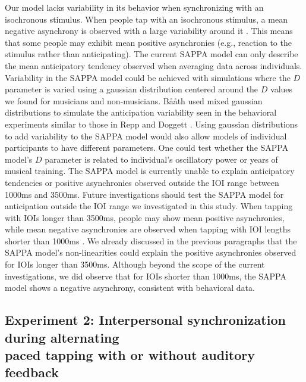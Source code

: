 \documentclass{report}
\begin{document}
Our model lacks variability in its behavior when synchronizing with an isochronous stimulus. When people tap with an isochronous stimulus, a mean negative asynchrony is observed with a large variability around it \cite{repp2005sensorimotor}. This means that some people may exhibit mean positive asynchronies (e.g., reaction to the stimulus rather than anticipating). The current SAPPA model can only describe the mean anticipatory tendency observed when averaging data across individuals. Variability in the SAPPA model could be achieved with simulations where the $D$ parameter is varied using a gaussian distribution centered around the $D$ values we found for musicians and non-musicians. B\aa\aa th \cite{baaaath2016estimating} used mixed gaussian distributions to simulate the anticipation variability seen in the behavioral experiments similar to those in Repp and Doggett \cite{repp2007tapping}. Using gaussian distributions to add variability to the SAPPA model would also allow models of individual participants to have different parameters. One could test whether the SAPPA model's $D$ parameter is related to individual's oscillatory power or years of musical training. The SAPPA model is currently unable to explain anticipatory tendencies or positive asynchronies observed outside the IOI range between 1000ms and 3500ms. Future investigations should test the SAPPA model for anticipation outside the IOI range we investigated in this study. When tapping with IOIs longer than 3500ms, people may show mean positive asynchronies, while mean negative asynchronies are observed when tapping with IOI lengths shorter than 1000ms \cite{miyake2004two}. We already discussed in the previous paragraphs that the SAPPA model's non-linearities could explain the positive asynchronies observed for IOIs longer than 3500ms. Although beyond the scope of the current investigations, we did observe that for IOIs shorter than 1000ms, the SAPPA model shows a negative asynchrony, consistent with behavioral data.

\subsection{Experiment 2: Interpersonal synchronization during alternating \\ paced tapping with or without auditory feedback}
\end{document}
